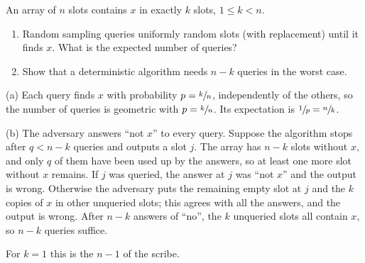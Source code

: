 \begin{exercisebox}
\begin{pproblem}\label{wp:kcopies}
    An array of $n$ slots contains $x$ in exactly $k$ slots, $1 \leq k < n$.
    \begin{enumerate}[label=(\alph*)]
        \item Random sampling queries uniformly random slots (with replacement) until it finds $x$.
              What is the expected number of queries?
        \item Show that a deterministic algorithm needs $n - k$ queries in the worst case.
    \end{enumerate}
\end{pproblem}
\tcblower
\begin{wsolution}
    (a) Each query finds $x$ with probability $p = \sfrac{k}{n}$, independently of the others, so the
    number of queries is geometric with $p = \sfrac{k}{n}$. Its expectation is
    $\sfrac{1}{p} = \sfrac{n}{k}$.

    (b) The adversary answers ``not $x$'' to every query. Suppose the algorithm stops after
    $q < n - k$ queries and outputs a slot $j$. The array has $n - k$ slots without $x$, and only
    $q$ of them have been used up by the answers, so at least one more slot without $x$ remains. If
    $j$ was queried, the answer at $j$ was ``not $x$'' and the output is wrong. Otherwise the
    adversary puts the remaining empty slot at $j$ and the $k$ copies of $x$ in other unqueried
    slots; this agrees with all the answers, and the output is wrong. After $n - k$ answers of
    ``no'', the $k$ unqueried slots all contain $x$, so $n - k$ queries suffice.

    For $k = 1$ this is the $n - 1$ of the scribe.
\end{wsolution}
\end{exercisebox}

